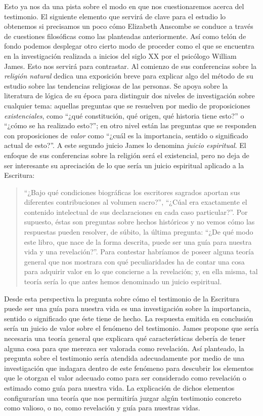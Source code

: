 Esto ya nos da una pista sobre el modo en que nos cuestionaremos acerca del
testimonio. El siguiente elemento que servirá de clave para el estudio lo
obtenemos si precisamos un poco cómo Elizabeth Anscombe se conduce a través de
cuestiones filosóficas como las planteadas anteriormente. Así como telón de
fondo podemos desplegar otro cierto modo de proceder como el que se encuentra en
la investigación realizada a inicios del siglo XX por el psicólogo William
James. Esto nos servirá para contrastar. Al comienzo de sus conferencias sobre
la \emph{religión natural} dedica una exposición breve para explicar algo del
método de su estudio sobre las tendencias religiosas de las personas. Se apoya
sobre la literatura de lógica de su época para distinguir dos niveles de
investigación sobre cualquier tema: aquellas preguntas que se resuelven por
medio de proposiciones \emph{existenciales}, como \enquote{¿qué constitución,
  qué origen, qué historia tiene esto?} o \enquote{¿cómo se ha realizado esto?};
en otro nivel están las preguntas que se responden con proposiciones de
\emph{valor} como \enquote{¿cuál es la importancia, sentido o significado actual
  de esto?}. A este segundo juicio James lo denomina \emph{juicio espiritual}.
El enfoque de sus conferencias sobre la religión será el existencial, pero no
deja de ser interesante su apreciación de lo que sería un juicio espiritual
aplicado a la Escritura:

\blockquote[{\cite[27]{james2002variedades}}]{\enquote{¿Bajo qué condiciones
    biográficas los escritores sagrados aportan sus diferentes contribuciones al
    volumen sacro?}, \enquote{¿Cúal era exactamente el contenido intelectual de
    sus declaraciones en cada caso particular?}. Por supuesto, éstas son
  preguntas sobre hechos históricos y no vemos cómo las respuestas pueden
  resolver, de súbito, la última pregunta: \enquote{¿De qué modo este libro, que
    nace de la forma descrita, puede ser una guía para nuestra vida y una
    revelación?}. Para contestar habríamos de poseer alguna teoría general que
  nos mostrara con qué peculiaridades ha de contar una cosa para adquirir valor
  en lo que concierne a la revelación; y, en ella misma, tal teoría sería lo que
  antes hemos denominado un juicio espiritual.}

Desde esta perspectiva la pregunta sobre cómo el testimonio de la Escritura
puede ser una guía para nuestra vida es una investigación sobre la importancia,
sentido o significado que éste tiene de hecho. La respuesta emitida en
conclusión sería un juicio de valor sobre el fenómeno del testimonio. James
propone que sería necesaria una teoría general que explicara qué características
debería de tener alguna cosa para que merezca ser valorada como revelación. Así
planteado, la pregunta sobre el testimonio sería atendida adecuadamente por
medio de una investigación que indagara dentro de este fenómeno para descubrir
los elementos que le otorgan el valor adecuado como para ser considerado como
revelación o estimado como guía para nuestra vida. La explicación de dichos
elementos configurarían una teoría que nos permitiría juzgar algún testimonio
concreto como valioso, o no, como revelación y guía para nuestras vidas.


